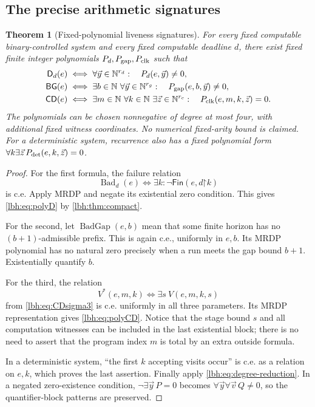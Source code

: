 \documentclass[11pt,letterpaper]{article}
\newtheorem{theorem}{Theorem}[section]
\theoremstyle{definition}
\theoremstyle{remark}
\newcommand{\N}{\mathbb N}
\newcommand{\Clock}{\mathsf{CD}}
\newcommand{\Gap}{\mathsf{BG}}
\newcommand{\Fixed}{\mathsf{D}}
\newcommand{\Fin}{\mathsf{Fin}}
\newcommand{\pref}{\mathord{\upharpoonright}}
\newcommand{\1}{\mathbf 1}
\begin{document}
\subsection{The precise arithmetic signatures}
\begin{theorem}[Fixed-polynomial liveness signatures]\label{lbh:thm:polynomial-signatures}
For every fixed computable binary-controlled system and every fixed
computable deadline $d$, there exist fixed finite integer polynomials
$P_d,P_{\rm gap},P_{\rm clk}$ such that
\begin{align}
 \Fixed_d(e)&\iff\forall\vec y\in\N^{r_d}:\quad P_d(e,\vec y)\ne0,
       \label{lbh:eq:polyD}\\
 \Gap(e)&\iff\exists b\in\N\ \forall\vec y\in\N^{r_g}:\quad
               P_{\rm gap}(e,b,\vec y)\ne0,
       \label{lbh:eq:polyBG}\\
 \Clock(e)&\iff\exists m\in\N\ \forall k\in\N\ \exists\vec z\in\N^{r_c}:\quad
               P_{\rm clk}(e,m,k,\vec z)=0.
       \label{lbh:eq:polyCD}
\end{align}
The polynomials can be chosen nonnegative of degree at most four, with
additional fixed witness coordinates. No numerical fixed-arity bound is
claimed. For a deterministic system, recurrence also has a fixed polynomial
form $\forall k\exists\vec z\,P_{\rm det}(e,k,\vec z)=0$.
\end{theorem}
\begin{proof}
For the first formula, the failure relation
\[
 \operatorname{Bad}_d(e)\iff\exists k:\neg\Fin(e,d\pref k)
\]
is c.e. Apply MRDP and negate its existential zero condition. This gives
\cref{lbh:eq:polyD} by \cref{lbh:thm:compact}.

For the second, let $\operatorname{BadGap}(e,b)$ mean that some finite
horizon has no $(b+1)$-admissible prefix. This is again c.e., uniformly in
$e,b$. Its MRDP polynomial has no natural zero precisely when a run meets
the gap bound $b+1$. Existentially quantify $b$.

For the third, the relation
\[
 V^*(e,m,k)\iff\exists s\ V(e,m,k,s)
\]
from \cref{lbh:eq:CDsigma3} is c.e. uniformly in all three parameters. Its
MRDP representation gives \cref{lbh:eq:polyCD}. Notice that the stage bound
$s$ and all computation witnesses can be included in the last existential
block; there is no need to assert that the program index $m$ is total by
an extra outside formula.

In a deterministic system, ``the first $k$ accepting visits occur'' is c.e.
as a relation on $e,k$, which proves the last assertion. Finally apply
\cref{lbh:eq:degree-reduction}. In a negated zero-existence condition,
$\neg\exists\vec y\,P=0$ becomes
$\forall\vec y\forall\vec v\,Q\ne0$, so the quantifier-block patterns
are preserved.
\end{proof}
\end{document}
